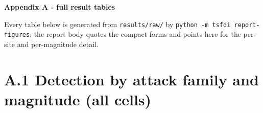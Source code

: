 \documentclass[10pt,a4paper]{article}
\begin{document}
\begin{center}
{\Large\bfseries Appendix A -\allowbreak{} full result tables\par}
\vspace{3pt}

\end{center}
\vspace{-2pt}
Every table below is generated from \texttt{results/\allowbreak{}raw/\allowbreak{}} by \texttt{python -\allowbreak{}m tsfdi report-\allowbreak{}figures}; the report body quotes the compact forms and points here for the per-\allowbreak{}site and per-\allowbreak{}magnitude detail.

\section*{A.1 Detection by attack family and magnitude (all cells)}
\end{document}
